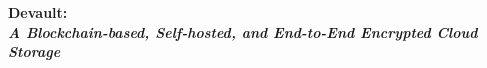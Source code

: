 {
  \huge
  \bfseries
  Devault: \\
  \mdseries
  \itshape
  \Large
  A Blockchain-based, Self-hosted, and End-to-End Encrypted Cloud Storage
  \par
}
